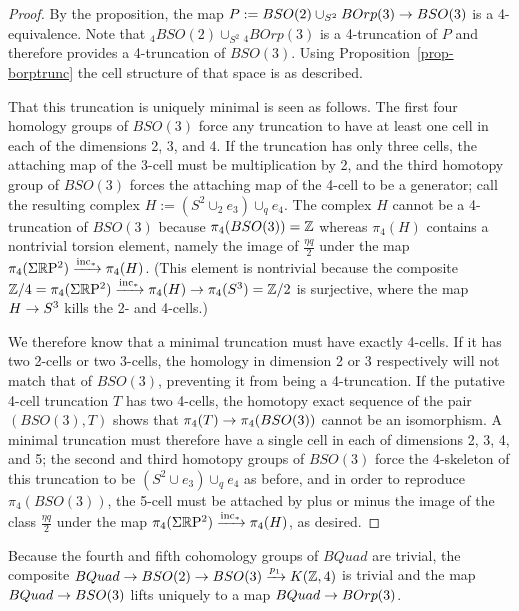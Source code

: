 \documentclass{amsart}
\begin{document}
\begin{proof}
By the proposition, the map $P := BSO(2) \cup_{S^2} BOrp(3) \rightarrow BSO(3)$ is a 4-equivalence.  Note that $_4 BSO(2) \cup_{S^2} {}_4 BOrp(3)$ is a 4-truncation of $P$ and therefore provides a 4-truncation of $BSO(3)$.  Using Proposition~\ref{prop-borptrunc} the cell structure of that space is as described.  

That this truncation is uniquely minimal is seen as follows.  The first four homology groups of $BSO(3)$ force any truncation to have at least one cell in each of the dimensions 2, 3, and 4.  If the truncation has only three cells, the attaching map of the 3-cell must be multiplication by 2, and the third homotopy group of $BSO(3)$ forces the attaching map of the 4-cell to be a generator; call the resulting complex $H := (S^2 \cup_2 e_3) \cup_q e_4$.  The complex $H$ cannot be a 4-truncation of $BSO(3)$ because $\pi_4(BSO(3)) = \mathbb Z$ whereas $\pi_4(H)$ contains a nontrivial torsion element, namely the image of $\frac{\eta q}{2}$ under the map $\pi_4(\Sigma \mathbb R \mathrm{P}^2) \xrightarrow{\mathrm{inc}_*} \pi_4(H)$.  (This element is nontrivial because the composite $\mathbb Z/4 = \pi_4(\Sigma \mathbb R \mathrm{P}^2) \xrightarrow{\mathrm{inc}_*} \pi_4(H) \rightarrow \pi_4(S^3) = \mathbb Z/2$ is surjective, where the map $H \rightarrow S^3$ kills the 2- and 4-cells.)

We therefore know that a minimal truncation must have exactly 4-cells.  If it has two 2-cells or two 3-cells, the homology in dimension 2 or 3 respectively will not match that of $BSO(3)$, preventing it from being a 4-truncation.  If the putative 4-cell truncation $T$ has two 4-cells, the homotopy exact sequence of the pair $(BSO(3), T)$ shows that $\pi_4(T) \rightarrow \pi_4(BSO(3))$ cannot be an isomorphism.  A minimal truncation must therefore have a single cell in each of dimensions 2, 3, 4, and 5; the second and third homotopy groups of $BSO(3)$ force the 4-skeleton of this truncation to be $(S^2 \cup e_3) \cup_q e_4$ as before, and in order to reproduce $\pi_4(BSO(3))$, the 5-cell must be attached by plus or minus the image of the class $\frac{\eta q}{2}$ under the map $\pi_4(\Sigma \mathbb R \mathrm{P}^2) \xrightarrow{\mathrm{inc}_*} \pi_4(H)$, as desired.  %
\end{proof}

Because the fourth and fifth cohomology groups of $BQuad$ are trivial, the composite $BQuad \rightarrow BSO(2) \rightarrow BSO(3) \xrightarrow{p_1} K(\mathbb Z,4)$ is trivial and the map $BQuad \rightarrow BSO(3)$ lifts uniquely to a map $BQuad \rightarrow BOrp(3)$.
\end{document}
